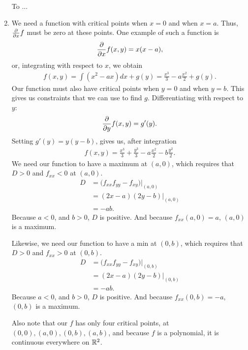 \documentclass{article}
\begin{document}
\begin{enumerate}
To ...
\item %
We need a function with critical points when $x=0$ and when $x=a$. Thus, $\frac{\partial}{\partial x} f$ must be zero at these points. One example of such a function is
\begin{align*}
  \frac{\partial}{\partial x} f(x,y) = x(x-a),
\end{align*}
or, integrating with respect to $x$, we obtain
\begin{align*}
  f(x,y) = \int (x^2-ax)dx + g(y) = \frac{x^3}{3}-a\frac{x^2}{2}+g(y).
\end{align*}
Our function must also have critical points when $y=0$ and when $y=b$. This gives us constraints that we can use to find $g$. Differentiating with respect to $y$:
\begin{align*}
  \frac{\partial}{\partial y} f(x,y) = g'(y).
\end{align*}
Setting $g'(y)=y(y-b)$, gives us, after integration
\begin{align*}
  f(x,y) = \frac{x^3}{3}+ \frac{y^3}{3}-a\frac{x^2}{2}-b\frac{y^2}{2}.
\end{align*}
We need our function to have a maximum at $(a,0)$, which requires that $D>0$ and $f_{xx}<0$ at $(a,0)$.
\begin{align*}
  D &= \Big(f_{xx}f_{yy}-f_{xy}\Big)\Big|_{(a,0)} \\
  &= (2x-a)(2y-b)\Big|_{(a,0)} \\
  &= -ab.
\end{align*}
Because $a<0$, and $b>0$, $D$ is positive. And because $f_{xx}(a,0)=a$, $(a,0)$ is a maximum. 

Likewise, we need our function to have a min at $(0,b)$, which requires that $D>0$ and $f_{xx}>0$ at $(0,b)$.
\begin{align*}
  D &= \Big(f_{xx}f_{yy}-f_{xy}\Big)\Big|_{(0,b)} \\
  &= (2x-a)(2y-b)\Big|_{(0,b)} \\
  &= -ab.
\end{align*}
Because $a<0$, and $b>0$, $D$ is positive. And because $f_{xx}(0,b)=-a$, $(0,b)$ is a maximum. 

Also note that our $f$ has only four critical points, at $(0,0), (a,0), (0,b), (a,b)$, and because $f$ is a polynomial, it is continuous everywhere on $\mathbb{R}^2$. 

\end{enumerate}
\end{document}
